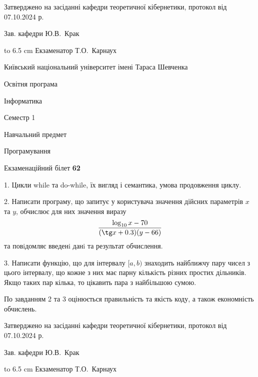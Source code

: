 \documentclass[12pt, ukrainian]{article}
\begin{document}
{\smallskip\smallskip \begin {scriptsize} Затверджено на засіданні кафедри теоретичної кібернетики, протокол   від   07.10.2024 р.\par\smallskip\smallskip\smallskip\smallskip
{\parbox {6.5 cm} {Зав. кафедри \dotfill Ю.В.~Крак}}\hspace {0.7cm} {\hbox to 6.5 cm { Екзаменатор \dotfill Т.О.~Карнаух}} \end{scriptsize}}
\vspace{0.9cm}
{{\begin {scriptsize}\par
{ \center  Київський національний університет імені Тараса Шевченка \par}
{\parbox {5 cm}{Освітня програма \hfill}{\parbox {7 cm}{Інформатика\hfill}}\parbox {6 cm}{\hfill Семестр 1}}\par
{\parbox {5 cm} {Навчальний предмет \hfill}\parbox {7 cm}{Програмування \hfill}\parbox {6cm}{\hfill}\par}\vspace{-15pt} \end{scriptsize}}{\center Екзаменаційний білет \No \textbf { 62 }\par}}
{%
1. Цикли while та do-while, їх вигляд і семантика, умова продовження циклу.%
\par
2. Написати програму, що запитує у користувача значення дійсних параметрів $x$ та $y$, обчислює для них значення виразу 
$$\frac{\log_{10} x - 70}{(\tg x + 0.3) (y - 66)}$$ 
та повiдомляє введенi данi та результат обчислення.

\par
3. Написати функцію, що для інтервалу $[a, b)$ знаходить найближчу пару чисел з цього інтервалу, що кожне з них має парну кількість різних простих дільників. Якщо таких пар кілька, то цікавить пара з найбільшою сумою.

По завданням 2 та 3 оцінюється правильність та якість коду, а також економність обчислень.

}
{\smallskip\smallskip \begin {scriptsize} Затверджено на засіданні кафедри теоретичної кібернетики, протокол   від   07.10.2024 р.\par\smallskip\smallskip\smallskip\smallskip
{\parbox {6.5 cm} {Зав. кафедри \dotfill Ю.В.~Крак}}\hspace {0.7cm} {\hbox to 6.5 cm { Екзаменатор \dotfill Т.О.~Карнаух}} \end{scriptsize}}
\vspace{0.9cm}
\end{document}
